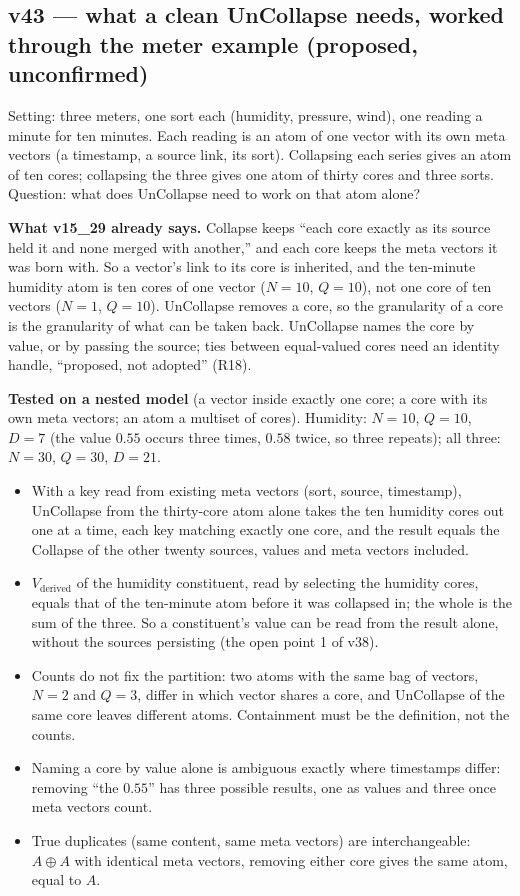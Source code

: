 \documentclass[11pt]{article}
\begin{document}
\subsection*{v43 --- what a clean UnCollapse needs, worked through the meter example (proposed, unconfirmed)}
Setting: three meters, one sort each (humidity, pressure, wind), one reading a minute for ten minutes. Each reading is an atom of one vector with its own meta vectors (a timestamp, a source link,
its sort). Collapsing each series gives an atom of ten cores; collapsing the three gives one atom of thirty cores and three sorts. Question: what does UnCollapse need to work on that atom alone?

\textbf{What v15\_29 already says.} Collapse keeps ``each core exactly as its source held it and none merged with another,'' and each core keeps the meta vectors it was born with.
So a vector's link to its core is inherited, and the ten-minute humidity atom is ten cores of one vector ($N=10$, $Q=10$), not one core of ten vectors ($N=1$, $Q=10$). UnCollapse
removes a core, so the granularity of a core is the granularity of what can be taken back. UnCollapse names the core by value, or by passing the source; ties between equal-valued
cores need an identity handle, ``proposed, not adopted'' (R18).

\textbf{Tested on a nested model} (a vector inside exactly one core; a core with its own meta vectors; an atom a multiset of cores). Humidity: $N=10$, $Q=10$, $D=7$ (the value $0.55$ occurs three times, $0.58$ twice, so three repeats);
all three: $N=30$, $Q=30$, $D=21$.
\begin{itemize}
\item With a key read from existing meta vectors (sort, source, timestamp), UnCollapse from the thirty-core atom alone takes the ten humidity cores out one at a time, each key matching exactly one core, and the result equals the Collapse
of the other twenty sources, values and meta vectors included.
\item $V_{\text{derived}}$ of the humidity constituent, read by selecting the humidity cores, equals that of the ten-minute atom before it was collapsed in; the whole is the sum of the three. So a constituent's value can be
read from the result alone, without the sources persisting (the open point 1 of v38).
\item Counts do not fix the partition: two atoms with the same bag of vectors, $N=2$ and $Q=3$, differ in which vector shares a core, and UnCollapse of the same core leaves different atoms. Containment must be the definition, not the counts.
\item Naming a core by value alone is ambiguous exactly where timestamps differ: removing ``the $0.55$'' has three possible results, one as values and three once meta vectors count.
\item True duplicates (same content, same meta vectors) are interchangeable: $A\oplus A$ with identical meta vectors, removing either core gives the same atom, equal to $A$.
\end{itemize}
\end{document}
